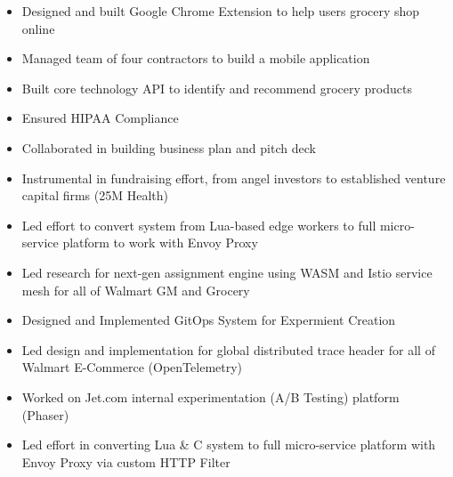 \documentclass[10pt,a4paper,ragged2e,withhyper]{altacv}
\begin{document}
\begin{paracol}{2}

\begin{itemize}
  \item Designed and built Google Chrome Extension to help users grocery shop online
  \item Managed team of four contractors to build a mobile application
  \item Built core technology API to identify and recommend grocery products
  \item Ensured HIPAA Compliance
  \item Collaborated in building business plan and pitch deck
  \item Instrumental in fundraising effort, from angel investors to established venture capital firms (25M Health)
\end{itemize}

\divider

\begin{itemize}
  \item Led effort to convert system from Lua-based edge workers to full micro-service platform to work with Envoy Proxy
  \item Led research for next-gen assignment engine using WASM and Istio service mesh for all of Walmart GM and Grocery
  \item Designed and Implemented GitOps System for Expermient Creation
  \item Led design and implementation for global distributed trace header for all of Walmart E-Commerce (OpenTelemetry)
\end{itemize}

\divider

\begin{itemize}
  \item Worked on Jet.com internal experimentation (A/B Testing) platform (Phaser)
  \item Led effort in converting Lua \& C system to full micro-service platform with Envoy Proxy via custom HTTP Filter
\end{itemize}


\end{paracol}
\end{document}
